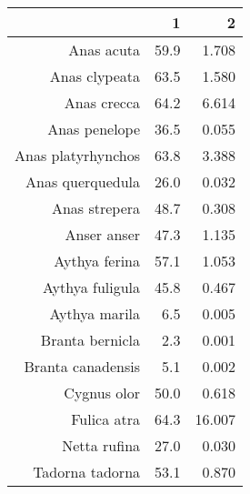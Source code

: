 \begin{table}[ht]
\centering
\begin{tabular}{rrr}
  \hline
 & 1 & 2 \\ 
  \hline
Anas acuta & 59.9 & 1.708 \\ 
  Anas clypeata & 63.5 & 1.580 \\ 
  Anas crecca & 64.2 & 6.614 \\ 
  Anas penelope & 36.5 & 0.055 \\ 
  Anas platyrhynchos & 63.8 & 3.388 \\ 
  Anas querquedula & 26.0 & 0.032 \\ 
  Anas strepera & 48.7 & 0.308 \\ 
  Anser anser & 47.3 & 1.135 \\ 
  Aythya ferina & 57.1 & 1.053 \\ 
  Aythya fuligula & 45.8 & 0.467 \\ 
  Aythya marila & 6.5 & 0.005 \\ 
  Branta bernicla & 2.3 & 0.001 \\ 
  Branta canadensis & 5.1 & 0.002 \\ 
  Cygnus olor & 50.0 & 0.618 \\ 
  Fulica atra & 64.3 & 16.007 \\ 
  Netta rufina & 27.0 & 0.030 \\ 
  Tadorna tadorna & 53.1 & 0.870 \\ 
   \hline
\end{tabular}
\end{table}
